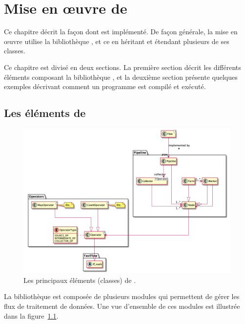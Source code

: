 
\chapter{Mise en \oe{}uvre de \PpFf}
\label{implementation.chap}


Ce chapitre décrit la fa\c{c}on dont  est impl\'ement\'e. 
%
De fa\c{c}on g\'en\'erale, la mise en \oe{}uvre utilise la biblioth\`eque , et ce en h\'eritant et \'etendant plusieurs de ses classes.

Ce chapitre est divis\'e en deux sections.
%
La premi\`ere section d\'ecrit les diff\'erents éléments composant la biblioth\`eque , et la deuxi\`eme section pr\'esente quelques exemples d\'ecrivant comment un programme \PpFf{} est compil\'e et ex\'ecut\'e.


\section{Les \'el\'ements de }

\begin{figure}
\centering
         \includegraphics[width=1.0\textwidth]{Figures/vueEnsemble.png}
      \caption{Les principaux éléments (classes) de .}
       \label{All.fig}
\end{figure}

La biblioth\`eque  est compos\'ee de plusieurs modules qui permettent de g\'erer les flux de traitement de donn\'ees. Une vue d'ensemble de ces modules est illustr\'ee dans la figure~\ref{All.fig}.

